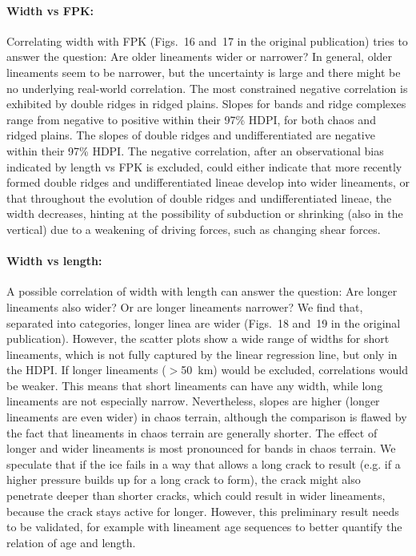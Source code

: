 \paragraph{Width vs FPK:} 
Correlating width with FPK (Figs.~16 and~17 in the original publication) tries to answer the question: Are older lineaments wider or narrower? In general, older lineaments seem to be narrower, but the uncertainty is large and there might be no underlying real-world correlation. The most constrained negative correlation is exhibited by double ridges in ridged plains. Slopes for bands and ridge complexes range from negative to positive within their 97\% HDPI, for both chaos and ridged plains. The slopes of double ridges and undifferentiated are negative within their 97\% HDPI. The negative correlation, after an observational bias indicated by length vs FPK is excluded, could either indicate that more recently formed double ridges and undifferentiated lineae develop into wider lineaments, or that throughout the evolution of double ridges and undifferentiated lineae, the width decreases, hinting at the possibility of subduction or shrinking (also in the vertical) due to a weakening of driving forces, such as changing shear forces.

\paragraph{Width vs length:} A possible correlation of width with length can answer the question: Are longer lineaments also wider? Or are longer lineaments narrower?  We find that, separated into categories, longer linea are wider (Figs.~18 and~19 in the original publication). However, the scatter plots show a wide range of widths for short lineaments, which is not fully captured by the linear regression line, but only in the HDPI. If longer lineaments ($>$\qty{50}{\km}) would be excluded, correlations would be weaker. This means that short lineaments can have any width, while long lineaments are not especially narrow. Nevertheless, slopes are higher (longer lineaments are even wider) in chaos terrain, although the comparison is flawed by the fact that lineaments in chaos terrain are generally shorter. The effect of longer and wider lineaments is most pronounced for bands in chaos terrain. We speculate that if the ice fails in a way that allows a long crack to result (e.g. if a higher pressure builds up for a long crack to form), the crack might also penetrate deeper than shorter cracks, which could result in wider lineaments, because the crack stays active for longer. However, this preliminary result needs to be validated, for example with lineament age sequences to better quantify the relation of age and length.\\

